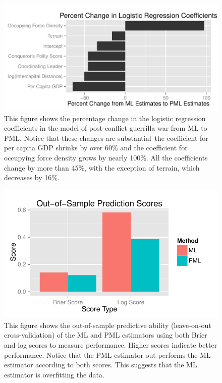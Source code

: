 \documentclass[12pt]{article}
\begin{document}
\begin{figure}[H]
\begin{center}
\includegraphics[scale = 1.0]{figs/weisiger-perc-change.pdf}
\caption{This figure shows the percentage change in the logistic regression coefficients in the model of post-conflict guerrilla war from ML to PML. Notice that these changes are substantial--the coefficient for per capita GDP shrinks by over 60\% and the coefficient for occupying force density grows by nearly 100\%. All the coefficients change by more than 45\%, with the exception of terrain, which decreases by 16\%.}\label{fig:weisiger-perc-change}
\end{center}
\end{figure}

\begin{figure}[H]
\begin{center}
\includegraphics[scale = 1.0]{figs/weisiger-out-sample-fit.pdf}
\caption{This figure shows the out-of-sample predictive ability (leave-on-out cross-validation) of the ML and PML estimators using both Brier and log scores to measure performance. Higher scores indicate better performance. Notice that the PML estimator out-performs the ML estimator according to both scores. This suggests that the ML estimator is overfitting the data.}\label{fig:weisiger-out-sample-fit}
\end{center}
\end{figure}
\end{document}
